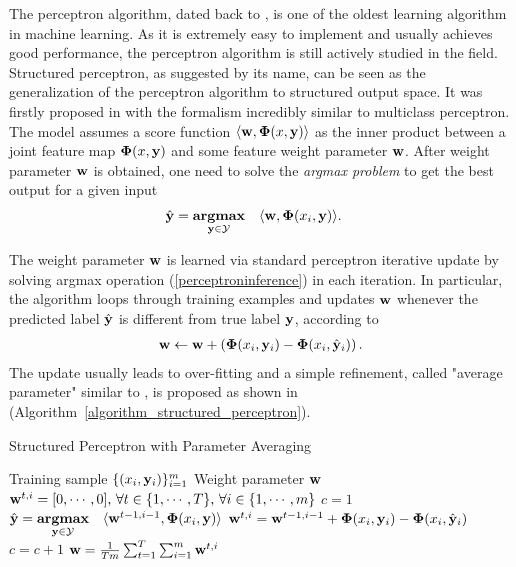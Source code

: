 {The perceptron algorithm, dated back to \citep{Rosenblatt58}, is one of the oldest learning algorithm in machine learning.
As it is extremely easy to implement and usually achieves good performance, the perceptron algorithm is still actively studied in the field.
Structured perceptron, as suggested by its name, can be seen as the generalization of the perceptron algorithm to structured output space.
It was firstly proposed in \citep{collins02a, collins02b} with the formalism incredibly similar to multiclass perceptron. 
The model assumes a score function $\langle \mathbf {w}, \mathbf{\Phi}(x,\mathbf {y}) \rangle$ as the inner product between a joint feature map $\mathbf{\Phi}(x,\mathbf {y})$ and some feature weight parameter $\mathbf {w}$.
After weight parameter $\mathbf {w}$ is obtained, one need to solve the \textit{argmax problem} to get the best output for a given input
\begin{align}
	\hat{\mathbf {y}} = \underset{\mathbf {y}\in\mathcal{Y}}{\textbf{argmax}} &\quad \langle \mathbf {w}, \mathbf{\Phi}(x_i,\mathbf {y}) \rangle.  \label{perceptroninference}
\end{align}

The weight parameter $\mathbf {w}$ is learned via standard perceptron iterative update by solving argmax operation (\ref{perceptroninference}) in each iteration.
In particular, the algorithm loops through training examples and updates $\mathbf {w}$ whenever the predicted label $\hat{\mathbf {y}}$ is different from true label $\mathbf {y}$, according to 
\begin{align*}
	\mathbf {w} \leftarrow \mathbf {w} + \left(\mathbf{\Phi}(x_i,\mathbf {y}_i) - \mathbf{\Phi}(x_i,\hat{\mathbf {y}}_i)\right).
\end{align*}
The update usually leads to over-fitting and a simple refinement, called "average parameter" similar to \citep{Freund99large}, is proposed as shown in (Algorithm~\ref{algorithm_structured_perceptron}).
\begin{algorithm}
\caption{Structured Perceptron with Parameter Averaging}
\label{algorithm_structured_perceptron}
\begin{algorithmic}[1]
	\REQUIRE Training sample $\lbrace (x_i,\mathbf {y}_i)\rbrace_{i=1}^m$
	\ENSURE Weight parameter $\mathbf {w}$
	\STATE $\mathbf {w}^{t,i}=[0,\cdots,0],\,\forall t\in\{1,\cdots,T\},\,\forall i\in\{1,\cdots,m\}$
	\STATE $c = 1$
			\STATE $\hat{\mathbf {y}} = \underset{\mathbf {y}\in\mathcal{Y}}{\textbf{argmax}} \quad \langle \mathbf {w}^{t-1,i-1}, \mathbf{\Phi}(x_i,\mathbf {y}) \rangle$
			\IF{$\hat{\vy}\neq\vy$}
				\STATE $\mathbf {w}^{t,i} = \mathbf {w}^{t-1,i-1} + \mathbf{\Phi}(x_i,\mathbf {y}_i) - \mathbf{\Phi}(x_i,\hat{\mathbf {y}}_i)$
			\ENDIF
			\STATE $c=c+1$
		\ENDFOR
	\ENDFOR
	\RETURN $\mathbf {w} = \frac{1}{Tm}\sum_{t=1}^{T}\sum_{i=1}^{m}\mathbf {w}^{t,i}$
\end{algorithmic}
\end{algorithm}

}
